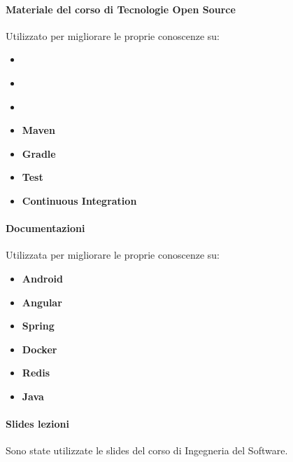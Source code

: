 \paragraph{Materiale del corso di Tecnologie Open Source}
Utilizzato per migliorare le proprie conoscenze su:
\begin{itemize}
	\item \textbf{}
	\item \textbf{}
	\item \textbf{}
	\item \textbf{Maven}
	\item \textbf{Gradle}
	\item \textbf{Test}
	\item \textbf{Continuous Integration}
\end{itemize}
\paragraph{Documentazioni}
Utilizzata per migliorare le proprie conoscenze su:
\begin{itemize}
	\item \textbf{Android}
	\item \textbf{Angular}
	\item \textbf{Spring}
	\item \textbf{Docker}
	\item \textbf{Redis}
	\item \textbf{Java}
\end{itemize}
\paragraph{Slides lezioni}
Sono state utilizzate le slides del corso di Ingegneria del Software. 
